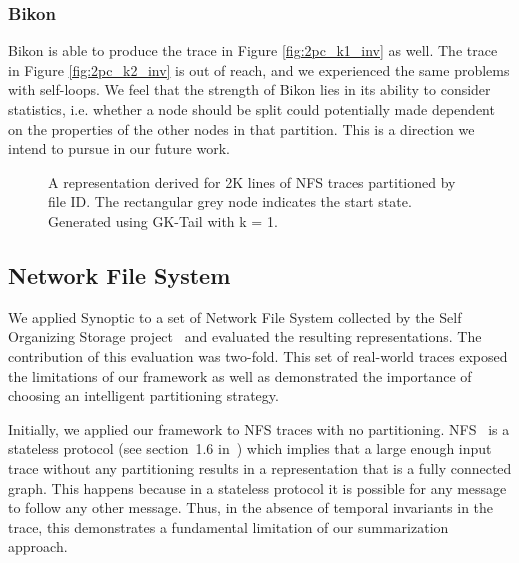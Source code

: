 
\subsubsection{Bikon}
\label{section:bisim-eval}

Bikon is able to produce the trace in Figure \ref{fig:2pc_k1_inv} as
well. The trace in Figure \ref{fig:2pc_k2_inv} is out of reach, and we
experienced the same problems with self-loops. We feel that the
strength of Bikon lies in its ability to consider statistics,
i.e. whether a node should be split could potentially made dependent
on the properties of the other nodes in that partition. This is a
direction we intend to pursue in our future work.

\begin{figure}[!t]
  \caption{A representation derived for 2K lines of NFS traces
    partitioned by file ID. The rectangular grey node indicates the
    start state. Generated using GK-Tail with k = 1.}
  \label{fig:nfs_1}
\end{figure}

\subsection{Network File System}

We applied Synoptic to a set of Network File System collected by the
Self Organizing Storage project~\cite{SOS03} and evaluated the
resulting representations. The contribution of this evaluation was
two-fold. This set of real-world traces exposed the limitations of our
framework as well as demonstrated the importance of choosing an
intelligent partitioning strategy.

Initially, we applied our framework to NFS traces with no
partitioning. NFS~\cite{NFSv3RFC} is a stateless protocol (see
section~1.6 in~\cite{NFSv3RFC}) which implies that a large enough
input trace without any partitioning results in a representation that
is a fully connected graph. This happens because in a stateless
protocol it is possible for any message to follow any other
message. Thus, in the absence of temporal invariants in the trace,
this demonstrates a fundamental limitation of our summarization
approach.

